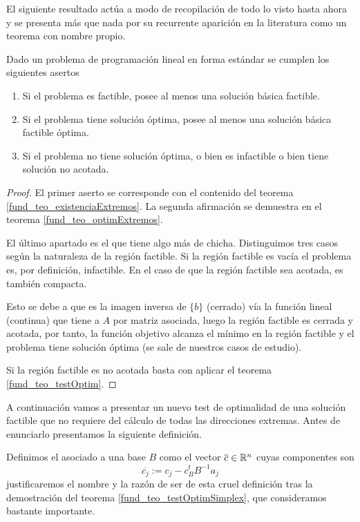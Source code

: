 El siguiente resultado actúa a modo de recopilación de todo lo visto hasta ahora y se presenta más que nada por su recurrente aparición en la literatura como un teorema con nombre propio.
\begin{theo}
	Dado un problema de programación lineal en forma estándar se cumplen los siguientes asertos
	\begin{enumerate}
		\item Si el problema es factible, posee al menos una solución básica factible.
		\item Si el problema tiene solución óptima, posee al menos una solución básica factible óptima.
		\item Si el problema no tiene solución óptima, o bien es infactible o bien tiene solución no acotada.
	\end{enumerate}
\end{theo}
\begin{proof}
	El primer aserto se corresponde con el contenido del teorema \ref{fund_teo_existenciaExtremos}. La segunda afirmación se demuestra en el teorema \ref{fund_teo_optimExtremos}.
	
	El último apartado es el que tiene algo más de chicha. Distinguimos tres casos según la naturaleza de la región factible. Si la región factible es vacía el problema es, por definición, infactible. En el caso de que la región factible sea acotada, es también compacta. 
	
	Esto se debe a que es la imagen inversa de $\{b\}$ (cerrado) vía la función lineal (continua) que tiene a $A$ por matriz asociada, luego la región factible es cerrada y acotada, por tanto, la función objetivo alcanza el mínimo en la región factible y el problema tiene solución óptima (se sale de nuestros casos de estudio).
	
	Si la región factible es no acotada basta con aplicar el teorema \ref{fund_teo_testOptim}.
\end{proof}
A continuación vamos a presentar un nuevo test de optimalidad de una solución factible que no requiere del cálculo de todas las direcciones extremas. Antes de enunciarlo presentamos la siguiente definición.
\begin{defi}
	Definimos el  asociado a una base $B$ como el vector $\overline{c}\in\mathbb{R}^n$ cuyas componentes son
	\begin{equation*}
		\overline{c_j}:=c_j-c_B^tB^{-1}a_j
	\end{equation*}
	justificaremos el nombre y la razón de ser de esta cruel definición tras la demostración del teorema \ref{fund_teo_testOptimSimplex}, que consideramos bastante importante.
\end{defi}
